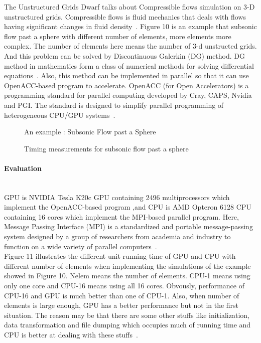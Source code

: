 \documentclass[11pt]{article}
\begin{document}
The Unstructured Grids Dwarf talks about Compressible flows simulation on 3-D unstructured grids. Compressible flows is fluid mechanics that deals with flows having significant changes in fluid density~\cite{UG_wiki}. Figure 10 is an example that subsonic flow past a sphere with different number of elements, more elements more complex. The number of elements here means the number of 3-d unstructed grids.
And this problem can be solved by Discontinuous Galerkin (DG) method. DG method in mathematics form a class of numerical methods for solving differential equations~\cite{UG_wiki2}. Also, this method can be implemented in parallel so that it can use OpenACC-based program to accelerate. OpenACC (for Open Accelerators) is a programming standard for parallel computing developed by Cray, CAPS, Nvidia and PGI. The standard is designed to simplify parallel programming of heterogeneous CPU/GPU systems~\cite{UG_wiki3}.

\begin{figure}[H]
\begin{minipage}{.5\textwidth}
  \centering
	\fbox{\texttt{[image: ug1]} }
	\caption{An example : Subsonic Flow past a Sphere ~\cite{UG}}
	\label{fig:ug1}
\end{minipage}%
\begin{minipage}{.5\textwidth}
  \centering
	\fbox{\texttt{[image: ug2]} }
	\caption{Timing measurements for subsonic flow past a sphere ~\cite{UG}}
	\label{table:ug2}
\end{minipage}%
\end{figure}


		\paragraph{Evaluation}
\hfill \\

GPU is NVIDIA Tesla K20c GPU containing 2496 multiprocessors which implement the OpenACC-based program ,and CPU is AMD Opteron 6128 CPU containing 16 cores which implement the MPI-based parallel program. Here, Message Passing Interface (MPI) is a standardized and portable message-passing system designed by a group of researchers from academia and industry to function on a wide variety of parallel computers~\cite{UG_wiki4}. \\

Figure 11 illustrates the different unit running time of GPU and CPU with different number of elements when implementing the simulations of the example showed in Figure 10. Nelem means the number of elements. CPU-1 means using only one core and CPU-16 means using all 16 cores. Obvously, performance of CPU-16 and GPU is much better than one of CPU-1. Also, when number of elements is large enough, GPU has a better performance but not in the first situation. The reason may be that there are some other stuffs like initialization, data transformation and file dumping which occupies much of running time and CPU is better at dealing with these stuffs~\cite{UG}. 
\end{document}
